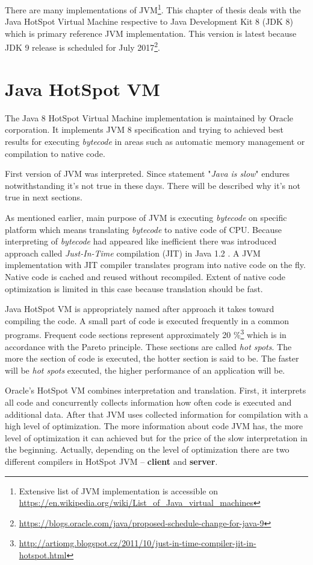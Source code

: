 \documentclass[
  digital, %
  oneside,
  notable, %
  nolof,     %
  nolot     %
]{fithesis3}
\begin{document}
There are many implementations of JVM\footnote{Extensive list of JVM implementation is accessible on \url{https://en.wikipedia.org/wiki/List_of_Java_virtual_machines}}. This chapter of thesis deals with the Java HotSpot Virtual Machine respective to Java Development Kit 8 (JDK 8) which is primary reference JVM implementation. This version is latest because JDK 9 release is scheduled for July 2017\footnote{\url{https://blogs.oracle.com/java/proposed-schedule-change-for-java-9}}.

\section{Java HotSpot VM}
The Java 8 HotSpot Virtual Machine implementation is maintained by Oracle corporation. It implements JVM 8 specification and trying to achieved best results for executing \textit{bytecode} in areas such as automatic memory management or compilation to native code.

First version of JVM was interpreted. Since statement "\textit{Java is slow}" endures notwithstanding it's not true in these days. There will be described why it's not true in next sections.

As mentioned earlier, main purpose of JVM is executing \textit{bytecode} on specific platform which means translating \textit{bytecode} to native code of CPU. Because interpreting of \textit{bytecode} had appeared like inefficient there was introduced approach called \textit{Just-In-Time} compilation (JIT) in Java 1.2 \cite{javavsc}. A JVM implementation with JIT compiler translates program into native code on the fly. Native code is cached and reused without recompiled. Extent of native code optimization is limited in this case because translation should be fast.

Java HotSpot VM is appropriately named after approach it takes toward compiling the code. A small part of code is executed frequently in a common programs. Frequent code sections represent approximately 20 \%\footnote{\url{http://artiomg.blogspot.cz/2011/10/just-in-time-compiler-jit-in-hotspot.html}} which is in accordance with the Pareto principle. These sections are called \textit{hot spots}. The more the section of code is executed, the hotter section is said to be. The faster will be \textit{hot spots} executed, the higher performance of an application will be. \cite{scott}

Oracle's HotSpot VM combines interpretation and translation. First, it interprets all code and concurrently collects information how often code is executed and additional data. After that JVM uses collected information for compilation with a high level of optimization. The more information about code JVM has, the more level of optimization it can achieved but for the price of the slow interpretation in the beginning. Actually, depending on the level of optimization there are two different compilers in HotSpot JVM -- \textbf{client} and \textbf{server}.
\end{document}
